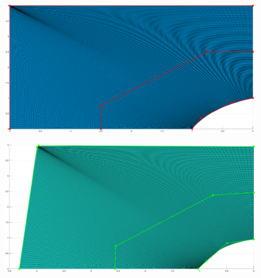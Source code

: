 \documentclass[submit,12pt]{aiaa-pretty} %
\begin{document}
\begin{figure}
\centering
\begin{minipage}{.5\textwidth}
  \centering
  \includegraphics[width=1.0\linewidth,height=.9\textwidth]{figures/undeformed_plate.png}
  \label{fig:test1}
\end{minipage}%
\begin{minipage}{.5\textwidth}
  \centering
  \includegraphics[width=1.0\linewidth,height=.9\textwidth]{figures/deformed_plate.png}
  \label{fig:test2}
\end{minipage}
\end{figure}
\end{document}
